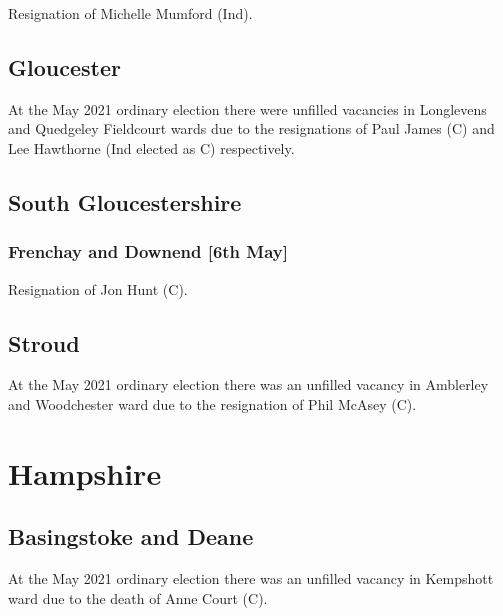 \documentclass[a4paper,openany]{book}
\begin{document}
\begin{resultsiii}

Resignation of Michelle Mumford (Ind).

\subsection*{Gloucester}

At the May 2021 ordinary election there were unfilled vacancies in Longlevens and Quedgeley Fieldcourt wards due to the resignations of Paul James (C) and Lee Hawthorne (Ind elected as C) respectively.

\subsection*{South Gloucestershire}

\subsubsection*{Frenchay and Downend \hspace*{\fill}\nolinebreak[1]%
	\enspace\hspace*{\fill}
	[6th May]}


Resignation of Jon Hunt (C).

\subsection*{Stroud}

At the May 2021 ordinary election there was an unfilled vacancy in Amblerley and Woodchester ward due to the resignation of Phil McAsey (C).

\section{Hampshire}

\subsection*{Basingstoke and Deane}

At the May 2021 ordinary election there was an unfilled vacancy in Kempshott ward due to the death of Anne Court (C).


\end{resultsiii}
\end{document}
